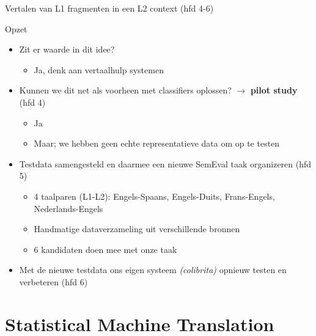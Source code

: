 \documentclass[8pt]{beamer}
\begin{document}
\begin{frame}{Vertalen van L1 fragmenten in een L2 context (hfd 4-6)}
    \begin{block}{Opzet}
        \begin{itemize}
            \item Zit er waarde in dit idee?
            \begin{itemize}
                \item Ja, denk aan vertaalhulp systemen
            \end{itemize}
            \item Kunnen we dit net als voorheen met classifiers oplossen? $\rightarrow$ \textbf{pilot study} (hfd 4)
            \begin{itemize}
                \item Ja
                \item Maar; we hebben geen echte representatieve data om op te testen
            \end{itemize}
            \item Testdata samengesteld en daarmee een nieuwe SemEval taak organizeren (hfd 5)
            \begin{itemize}
                \item 4 taalparen (L1-L2): Engels-Spaans, Engels-Duits, Frans-Engels, Nederlands-Engels
                \item Handmatige dataverzameling uit verschillende bronnen
                \item 6 kandidaten doen mee met onze taak
            \end{itemize}
            \item Met de nieuwe testdata ons eigen systeem \emph{(colibrita)} opnieuw testen en verbeteren (hfd 6)
        \end{itemize}
    \end{block}
\end{frame}

\section{Statistical Machine Translation}
\end{document}
